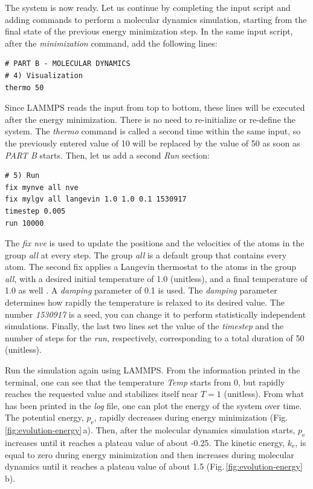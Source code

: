 \documentclass[9pt,tutorial]{livecoms}
\begin{document}
The system is now ready. Let us continue by completing the input script and adding commands to perform a molecular dynamics simulation, starting from the final state of the previous energy minimization step. In the same input script, after the \textit{minimization} command, add the following
lines:
{\normalsize \begin{verbatim}
# PART B - MOLECULAR DYNAMICS
# 4) Visualization
thermo 50
\end{verbatim}}
Since LAMMPS reads the input from top to bottom, these lines will be executed after the energy minimization. There is no need to re-initialize or re-define the system. The \textit{thermo} command is called a second time within the same input, so the previously entered value of 10 will be replaced by
the value of 50 as soon as \textit{PART B} starts. Then, let us add a second \textit{Run} section:
{\normalsize \begin{verbatim}
# 5) Run
fix mynve all nve
fix mylgv all langevin 1.0 1.0 0.1 1530917
timestep 0.005
run 10000
\end{verbatim}}
The \textit{fix nve} is used to update the positions and the velocities of the atoms in the group \textit{all} at every step. The group \textit{all} is a default group that contains every atom. The second fix applies a Langevin thermostat to the atoms in the group \textit{all}, with a desired initial temperature of 1.0 (unitless), and a final temperature of 1.0 as well \cite{schneider1978molecular}. A \textit{damping} parameter of 0.1 is used. The \textit{damping} parameter determines how rapidly the temperature is relaxed to its desired value. The number \textit{1530917} is a seed, you can change it to perform statistically independent simulations. Finally, the last two lines set the value of the \textit{timestep} and the number of steps for the \textit{run}, respectively, corresponding to a total duration of 50 (unitless).

Run the simulation again using LAMMPS. From the information printed in the terminal, one can see that the temperature \textit{Temp} starts from 0, but rapidly reaches the requested value and stabilizes itself near $T=1$ (unitless). From what has been printed in the \textit{log} file, one can plot the energy of the system over time. The potential energy, $p_\text{e}$, rapidly decreases during energy minimization (Fig.\,\ref{fig:evolution-energy}\,a). Then, after the molecular dynamics simulation starts, $p_\text{e}$ increases until it reaches a plateau value of about -0.25. The kinetic energy, $k_\text{e}$, is equal to zero during energy minimization and then increases during molecular dynamics until it reaches a plateau value of about 1.5 (Fig.\,\ref{fig:evolution-energy}\,b).
\end{document}
